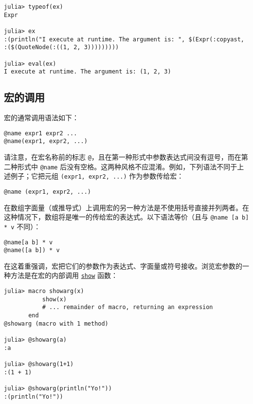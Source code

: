 \begin{lstlisting}
julia> typeof(ex)
Expr

julia> ex
:(println("I execute at runtime. The argument is: ", $(Expr(:copyast, :($(QuoteNode(:((1, 2, 3)))))))))

julia> eval(ex)
I execute at runtime. The argument is: (1, 2, 3)
\end{lstlisting}



\hypertarget{14488850884072492512}{}


\subsection{宏的调用}



宏的通常调用语法如下：




\begin{verbatim}
@name expr1 expr2 ...
@name(expr1, expr2, ...)
\end{verbatim}



请注意，在宏名称前的标志 \texttt{@}，且在第一种形式中参数表达式间没有逗号，而在第二种形式中 \texttt{@name} 后没有空格。这两种风格不应混淆。例如，下列语法不同于上述例子；它把元组 \texttt{(expr1, expr2, ...)} 作为参数传给宏：




\begin{verbatim}
@name (expr1, expr2, ...)
\end{verbatim}



在数组字面量（或推导式）上调用宏的另一种方法是不使用括号直接并列两者。在这种情况下，数组将是唯一的传给宏的表达式。以下语法等价（且与 \texttt{@name [a b] * v} 不同）：




\begin{verbatim}
@name[a b] * v
@name([a b]) * v
\end{verbatim}



在这着重强调，宏把它们的参数作为表达式、字面量或符号接收。浏览宏参数的一种方法是在宏的内部调用 \hyperlink{4561869563484222675}{\texttt{show}} 函数：




\begin{verbatim}
julia> macro showarg(x)
           show(x)
           # ... remainder of macro, returning an expression
       end
@showarg (macro with 1 method)

julia> @showarg(a)
:a

julia> @showarg(1+1)
:(1 + 1)

julia> @showarg(println("Yo!"))
:(println("Yo!"))
\end{verbatim}



